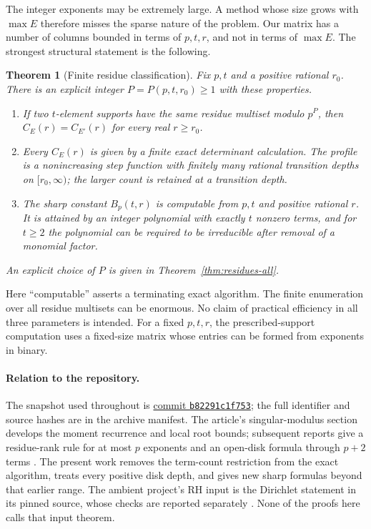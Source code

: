\documentclass[11pt,letterpaper]{article}
\newtheorem{theorem}{Theorem}[section]
\theoremstyle{definition}\newtheorem{definition}[theorem]{Definition}
\theoremstyle{remark}\newtheorem{remark}[theorem]{Remark}
\begin{document}
The integer exponents may be extremely large. A method whose size grows
with $\max E$ therefore misses the sparse nature of the problem. Our
matrix has a number of columns bounded in terms of $p,t,r$, and not in
terms of $\max E$. The strongest structural statement is the following.

\begin{theorem}[Finite residue classification]\label{thm:headline}
Fix $p,t$ and a positive rational $r_0$. There is an explicit integer
$P=P(p,t,r_0)\ge1$ with these properties.
\begin{enumerate}[label=\textup{(\alph*)}]
\item If two $t$-element supports have the same residue multiset modulo
$p^P$, then $C_E(r)=C_{E'}(r)$ for every real $r\ge r_0$.
\item Every $C_E(r)$ is given by a finite exact determinant calculation.
The profile is a nonincreasing step function with finitely many rational
transition depths on $[r_0,\infty)$; the larger count is retained at a
transition depth.
\item The sharp constant $B_p(t,r)$ is computable from $p,t$ and positive
rational $r$. It is attained by an integer polynomial with exactly $t$
nonzero terms, and for $t\ge2$ the polynomial can be required to be
irreducible after removal of a monomial factor.
\end{enumerate}
An explicit choice of $P$ is given in Theorem~\ref{thm:residues-all}.
\end{theorem}

Here ``computable'' asserts a terminating exact algorithm. The finite
enumeration over all residue multisets can be enormous. No claim of
practical efficiency in all three parameters is intended. For a fixed
$p,t,r$, the prescribed-support computation uses a fixed-size matrix
whose entries can be formed from exponents in binary.

\paragraph{Relation to the repository.}
The snapshot used throughout is
\href{https://github.com/VladimirReshetnikov/ProveIt/commit/b82291c1f75389938c7464ef161907d7d5e75b2a}{commit \texttt{b82291c1f753}};
the full identifier and source hashes are in the archive manifest.
The article's singular-modulus section develops the moment recurrence
and local root bounds; subsequent reports give a residue-rank rule for
at most $p$ exponents and an open-disk formula through $p+2$ terms
\cite{ProveIt,RankPacket,SharpPacket}.
The present work removes the term-count restriction from the exact
algorithm, treats every positive disk depth, and gives new sharp
formulas beyond that earlier range. The ambient project's RH input is
the Dirichlet statement in its pinned source, whose checks are reported
separately \cite{Sernau,Sutherland}. None of the proofs here calls that
input theorem.
\end{document}
